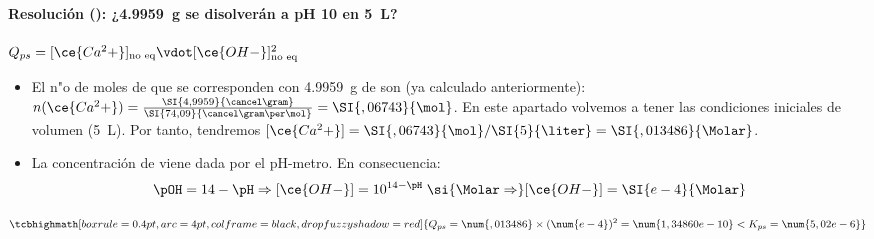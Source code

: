 \begin{frame}
	\frametitle{\ejerciciocmd}
	\framesubtitle{Resolución (): ¿\SI{4,9959}{\gram} se disolverán a pH \num{10} en \SI{5}{\liter}?}
	 $Q_{ps} = [\ce{Ca^2+}]_{\text{no eq}}\vdot[\ce{OH-}]^2_{\text{no eq}}$
	\begin{itemize}
		\item El n"o de moles de  que se corresponden con \SI{4,9959}{\gram} de  son (ya calculado anteriormente): $n(\ce{Ca^2+}) = \frac{\SI{4,9959}{\cancel\gram}}{\SI{74,09}{\cancel\gram\per\mol}} = \SI{,06743}{\mol}$. En este apartado volvemos a tener las condiciones iniciales de volumen (\SI{5}{\liter}). Por tanto, tendremos $[\ce{Ca^2+}] = \SI{,06743}{\mol}/\SI{5}{\liter} = \SI{,013486}{\Molar}$.
		\item La concentración de  viene dada por el pH-metro. En consecuencia:
			$$
				\pOH = 14-\pH\Rightarrow[\ce{OH-}] = 10^{14-\pH}\;\si{\Molar\Rightarrow}[\ce{OH-}] = \SI{e-4}{\Molar}
			$$
	\end{itemize}
	$$
		\tcbhighmath[boxrule=0.4pt,arc=4pt,colframe=black,drop fuzzy shadow=red]{Q_{ps} = \num{,013486}\times (\num{e-4})^2 = \num{1,34860e-10} < K_{ps} = \num{5,02e-6}}
	$$
	\begin{center}
	\end{center}
\end{frame}